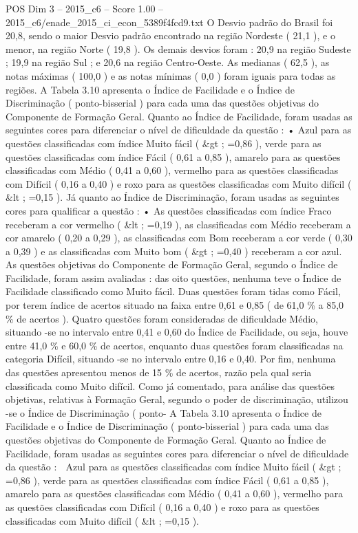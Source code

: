 \begin{textsample}{POS Dim 3 – 2015\_c6 – Score 1.00 – 2015\_c6/enade\_2015\_ci\_econ\_5389f4fcd9.txt}
O Desvio padrão do Brasil foi 20,8, sendo o maior Desvio padrão encontrado na região Nordeste ( 21,1 ), e o menor, na região Norte ( 19,8 ).
Os demais desvios foram : 20,9 na região Sudeste ; 19,9 na região Sul ; e 20,6 na região Centro-Oeste.
As medianas ( 62,5 ), as notas máximas ( 100,0 ) e as notas mínimas ( 0,0 ) foram iguais para todas as regiões.
A Tabela 3.10 apresenta o Índice de Facilidade e o Índice de Discriminação ( ponto-bisserial ) para cada uma das questões objetivas do Componente de Formação Geral.
Quanto ao Índice de Facilidade, foram usadas as seguintes cores para diferenciar o nível de dificuldade da questão : • Azul para as questões classificadas com índice Muito fácil ( \&gt ; =0,86 ), verde para as questões classificadas com índice Fácil ( 0,61 a 0,85 ), amarelo para as questões classificadas com Médio ( 0,41 a 0,60 ), vermelho para as questões classificadas com Difícil ( 0,16 a 0,40 ) e roxo para as questões classificadas com Muito difícil ( \&lt ; =0,15 ).
Já quanto ao Índice de Discriminação, foram usadas as seguintes cores para qualificar a questão : • As questões classificadas com índice Fraco receberam a cor vermelho ( \&lt ; =0,19 ), as classificadas com Médio receberam a cor amarelo ( 0,20 a 0,29 ), as classificadas com Bom receberam a cor verde ( 0,30 a 0,39 ) e as classificadas com Muito bom ( \&gt ; =0,40 ) receberam a cor azul.
As questões objetivas do Componente de Formação Geral, segundo o Índice de Facilidade, foram assim avaliadas : das oito questões, nenhuma teve o Índice de Facilidade classificado como Muito fácil.
Duas questões foram tidas como Fácil, por terem índice de acertos situado na faixa entre 0,61 e 0,85 ( de 61,0 \% a 85,0 \% de acertos ).
Quatro questões foram consideradas de dificuldade Médio, situando -se no intervalo entre 0,41 e 0,60 do Índice de Facilidade, ou seja, houve entre 41,0 \% e 60,0 \% de acertos, enquanto duas questões foram classificadas na categoria Difícil, situando -se no intervalo entre 0,16 e 0,40.
Por fim, nenhuma das questões apresentou menos de 15 \% de acertos, razão pela qual seria classificada como Muito difícil.
Como já comentado, para análise das questões objetivas, relativas à Formação Geral, segundo o poder de discriminação, utilizou -se o Índice de Discriminação ( ponto- A Tabela 3.10 apresenta o Índice de Facilidade e o Índice de Discriminação ( ponto-bisserial ) para cada uma das questões objetivas do Componente de Formação Geral.
Quanto ao Índice de Facilidade, foram usadas as seguintes cores para diferenciar o nível de dificuldade da questão :  Azul para as questões classificadas com índice Muito fácil ( \&gt ; =0,86 ), verde para as questões classificadas com índice Fácil ( 0,61 a 0,85 ), amarelo para as questões classificadas com Médio ( 0,41 a 0,60 ), vermelho para as questões classificadas com Difícil ( 0,16 a 0,40 ) e roxo para as questões classificadas com Muito difícil ( \&lt ; =0,15 ).

\end{textsample}
